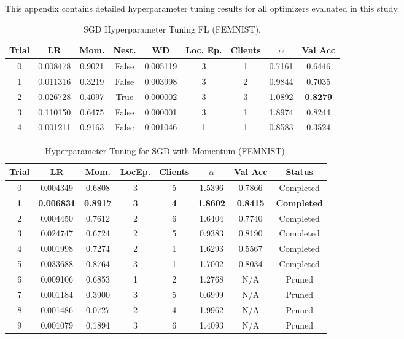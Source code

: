 \documentclass[10pt,twocolumn,letterpaper]{article}
\begin{document}
    This appendix contains detailed hyperparameter tuning results for all optimizers evaluated in this study.

    \begin{table}[h!]
        \centering
        \caption{SGD Hyperparameter Tuning FL (FEMNIST).}
        \label{tab:sgd_hparams}
        \begin{tabular}{|c|c|c|c|c|c|c|c|c|}
            \hline
            \textbf{Trial} & \textbf{LR} & \textbf{Mom.} & \textbf{Nest.} & \textbf{WD} & \textbf{Loc. Ep.} & \textbf{Clients} & $\alpha$ & \textbf{Val Acc} \\
            \hline
            0 & 0.008478 & 0.9021 & False & 0.005119 & 3 & 1 & 0.7161 & 0.6446 \\
            \hline
            1 & 0.011316 & 0.3219 & False & 0.003998 & 3 & 2 & 0.9844 & 0.7035 \\
            \hline
            2 & 0.026728 & 0.4097 & True & 0.000002 & 3 & 3 & 1.0892 & \textbf{0.8279} \\
            \hline
            3 & 0.110150 & 0.6475 & False & 0.000001 & 3 & 1 & 1.8974 & 0.8244 \\
            \hline
            4 & 0.001211 & 0.9163 & False & 0.001046 & 1 & 1 & 0.8583 & 0.3524 \\
            \hline
        \end{tabular}
    \end{table}

    \begin{table}[h]
        \centering
        \caption{Hyperparameter Tuning for SGD with Momentum (FEMNIST).}
        \label{tab:sgd_momentum_fl_summary}
        \begin{tabular}{cccccccc}
            \toprule
            \textbf{Trial} & \textbf{LR} & \textbf{Mom.} & \textbf{LocEp.} & \textbf{Clients} & $\alpha$ & \textbf{Val Acc} & \textbf{Status} \\
            \midrule
            0 & 0.004349 & 0.6808 & 3 & 5 & 1.5396 & 0.7866 & Completed \\
            \textbf{1} & \textbf{0.006831} & \textbf{0.8917} & \textbf{3} & \textbf{4} & \textbf{1.8602} & \textbf{0.8415} & \textbf{Completed} \\
            2 & 0.004450 & 0.7612 & 2 & 6 & 1.6404 & 0.7740 & Completed \\
            3 & 0.024747 & 0.6724 & 2 & 5 & 0.9383 & 0.8190 & Completed \\
            4 & 0.001998 & 0.7274 & 2 & 1 & 1.6293 & 0.5567 & Completed \\
            5 & 0.033688 & 0.8764 & 3 & 1 & 1.7002 & 0.8034 & Completed \\
            6 & 0.009106 & 0.6853 & 1 & 2 & 1.2768 & N/A & Pruned \\
            7 & 0.001184 & 0.3900 & 3 & 5 & 0.6999 & N/A & Pruned \\
            8 & 0.001486 & 0.0727 & 2 & 4 & 1.9962 & N/A & Pruned \\
            9 & 0.001079 & 0.1894 & 3 & 6 & 1.4093 & N/A & Pruned \\
            \bottomrule
        \end{tabular}
    \end{table}
\end{document}
